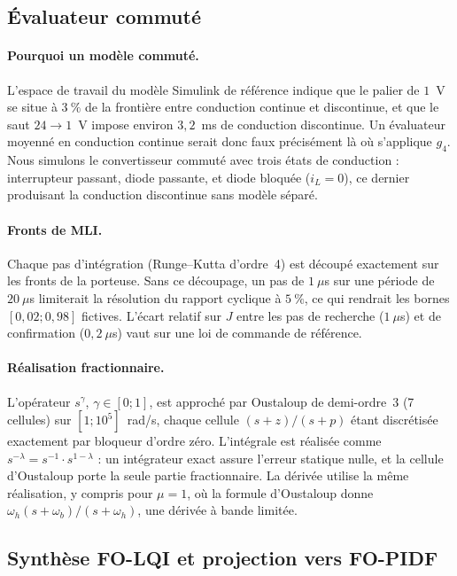 \subsection{Évaluateur commuté}
\label{sec:evaluateur}

\paragraph{Pourquoi un modèle commuté.}
L'espace de travail du modèle Simulink de référence indique que le palier de
$1$~V se situe à $3~\%$ de la frontière entre conduction continue et
discontinue, et que le saut $24\to1$~V impose environ $3{,}2$~ms de conduction
discontinue. Un évaluateur moyenné en conduction continue serait donc faux
précisément là où s'applique $g_4$. Nous simulons le convertisseur commuté
avec trois états de conduction : interrupteur passant, diode passante, et
diode bloquée ($i_L=0$), ce dernier produisant la conduction discontinue sans
modèle séparé.

\paragraph{Fronts de MLI.}
Chaque pas d'intégration (Runge--Kutta d'ordre~4) est découpé exactement sur
les fronts de la porteuse. Sans ce découpage, un pas de $1~\mu$s sur une
période de $20~\mu$s limiterait la résolution du rapport cyclique à $5~\%$,
ce qui rendrait les bornes $[0{,}02;0{,}98]$ fictives. L'écart relatif sur $J$
entre les pas de recherche ($1~\mu$s) et de confirmation ($0{,}2~\mu$s) vaut
\ChiffreEcartPas{} sur une loi de commande de référence.

\paragraph{Réalisation fractionnaire.}
L'opérateur $s^\gamma$, $\gamma\in[0;1]$, est approché par Oustaloup de
demi-ordre~3 (7 cellules) sur $[1;10^5]$~rad/s, chaque cellule
$(s+z)/(s+p)$ étant discrétisée exactement par bloqueur d'ordre zéro.
L'intégrale est réalisée comme $s^{-\lambda}=s^{-1}\cdot s^{1-\lambda}$ : un
intégrateur exact assure l'erreur statique nulle, et la cellule d'Oustaloup
porte la seule partie fractionnaire. La dérivée utilise la même réalisation,
y compris pour $\mu=1$, où la formule d'Oustaloup donne
$\omega_h(s+\omega_b)/(s+\omega_h)$, une dérivée à bande limitée.

\subsection{Synthèse FO-LQI et projection vers FO-PIDF}
\label{sec:projection}

